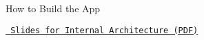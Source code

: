 
\begin{DoxyItemize}
\item How to Build the App
\item \href{Presentation.pdf}{\texttt{ Slides for Internal Architecture (P\+DF)}} 
\end{DoxyItemize}